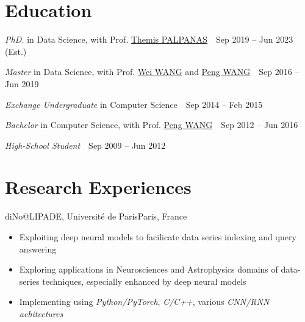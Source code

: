 \documentclass{resume}
\begin{document}


\linespread{0.95}

% 
% 

\section{Education}

\textit{PhD.} in Data Science, with Prof. \href{http://helios.mi.parisdescartes.fr/~themisp/home.html}{\color{black} Themis PALPANAS}\ \ \hfill Sep 2019 -- Jun 2023 (Est.)\ \

\textit{Master} in Data Science, with Prof. \href{http://www.cs.fudan.edu.cn/en/?page_id=2439}{\color{black} Wei WANG} and \href{http://homepage.fudan.edu.cn/pwang/}{\color{black} Peng WANG}\ \ \hfill Sep 2016 -- Jun 2019\ \ 

\textit{Exchange Undergraduate} in Computer Science\ \ \hfill Sep 2014 -- Feb 2015\ \

\textit{Bachelor} in Computer Science, with Prof. \href{http://homepage.fudan.edu.cn/pwang/}{\color{black} Peng WANG}\ \ \hfill Sep 2012 -- Jun 2016\ \

\textit{High-School Student}\ \ \hfill Sep 2009 -- Jun 2012\ \

% 
% 

\section{Research Experiences}

{diNo@LIPADE, Université de Paris}{Paris, France}
\begin{itemize}
  \item Exploiting deep neural models to facilicate data series indexing and query answering
  \item Exploring applications in Neurosciences and Astrophysics domains of data-series techniques, especially enhanced by deep neural models
  \item Implementing using \emph{Python/PyTorch}, \emph{C/C++}, various \emph{CNN/RNN achitectures}
\end{itemize}
\end{document}
